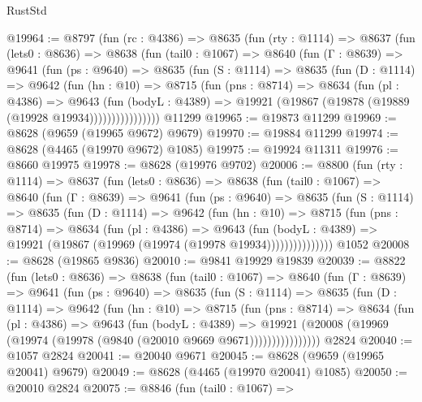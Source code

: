 \begin{lexlean}{RustStd}
\begin{coremodule}
@19964 := @8797
    (fun (rc : @4386) =>
    @8635
      (fun (rty : @1114) =>
      @8637
        (fun (lets0 : @8636) =>
        @8638
          (fun (tail0 : @1067) =>
          @8640
            (fun (Γ : @8639) =>
            @9641
              (fun (ps : @9640) =>
              @8635
                (fun (S : @1114) =>
                @8635
                  (fun (D : @1114) =>
                  @9642
                    (fun (hn : @10) =>
                    @8715
                      (fun (pns : @8714) =>
                      @8634
                        (fun (pl : @4386) =>
                        @9643
                          (fun (bodyL : @4389) =>
                          @19921 (@19867 (@19878 (@19889 (@19928 @19934))))))))))))))))
    @11299
@19965 := @19873 @11299
@19969 := @8628 (@9659 (@19965 @9672) @9679)
@19970 := @19884 @11299
@19974 := @8628 (@4465 (@19970 @9672) @1085)
@19975 := @19924 @11311
@19976 := @8660 @19975
@19978 := @8628 (@19976 @9702)
@20006 := @8800
    (fun (rty : @1114) =>
    @8637
      (fun (lets0 : @8636) =>
      @8638
        (fun (tail0 : @1067) =>
        @8640
          (fun (Γ : @8639) =>
          @9641
            (fun (ps : @9640) =>
            @8635
              (fun (S : @1114) =>
              @8635
                (fun (D : @1114) =>
                @9642
                  (fun (hn : @10) =>
                  @8715
                    (fun (pns : @8714) =>
                    @8634
                      (fun (pl : @4386) =>
                      @9643
                        (fun (bodyL : @4389) =>
                        @19921 (@19867 (@19969 (@19974 (@19978 @19934)))))))))))))))
    @1052
@20008 := @8628 (@19865 @9836)
@20010 := @9841 @19929 @19839
@20039 := @8822
    (fun (lets0 : @8636) =>
    @8638
      (fun (tail0 : @1067) =>
      @8640
        (fun (Γ : @8639) =>
        @9641
          (fun (ps : @9640) =>
          @8635
            (fun (S : @1114) =>
            @8635
              (fun (D : @1114) =>
              @9642
                (fun (hn : @10) =>
                @8715
                  (fun (pns : @8714) =>
                  @8634
                    (fun (pl : @4386) =>
                    @9643
                      (fun (bodyL : @4389) =>
                      @19921
                        (@20008 (@19969 (@19974 (@19978 (@9840 (@20010 @9669 @9671))))))))))))))))
    @2824
@20040 := @1057 @2824
@20041 := @20040 @9671
@20045 := @8628 (@9659 (@19965 @20041) @9679)
@20049 := @8628 (@4465 (@19970 @20041) @1085)
@20050 := @20010 @2824
@20075 := @8846
    (fun (tail0 : @1067) =>

\end{coremodule}
\end{lexlean}
